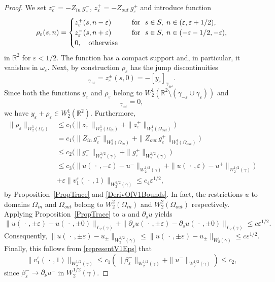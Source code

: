 \documentclass[reqno]{amsart}
\theoremstyle{plain}
\numberwithin{equation}{section}
\newcommand{\Real}{\mathbb R}
\newcommand{\eps}{\varepsilon}
\renewcommand{\leq}{\leqslant}
\begin{document}
\begin{proof}
We set $z_\eps^-=-Z_{in}\, g_\eps^-$, $z_\eps^+=-Z_{out}\, g_\eps^+$ and introduce  function
\begin{equation}\label{RhoEps}
\rho_\eps(s, n)=
\begin{cases}
   z_\eps^+(s,n-\eps)&\quad \hbox{for \ }
                  s\in S, \; n\in (\eps, \eps+1/2 ), \\
    z_\eps^-(s,n+\eps)&\quad \hbox{for \ }
               s\in S, \; n\in (-\eps-1/2,-\eps), \\
   0,\quad \hbox{otherwise}
\end{cases}
\end{equation}
in  $\Real^2$ for $\eps<1/2$.
The function has a compact support and,  in particular, it vanishes in $\omega_\eps$.
Next, by construction $\rho_\eps$ has the jump discontinuities
\begin{equation*}
  [\rho_\eps]_{\gamma_{\pm\eps}}=z_\eps^\pm(s,0)=-[y_\eps]_{\gamma_{\pm\eps}}.
\end{equation*}
Since both the functions $y_\eps$ and $\rho_\eps$ belong to $W_2^1(\Real^2\setminus(\gamma_{-\eps}\cup \gamma_\eps))$
and
\begin{equation*}
 [y_\eps+\rho_\eps]_{\gamma_{\pm\eps}}=0,
\end{equation*}
we have $y_\eps+\rho_\eps\in W_2^1(\Real^2)$. Furthermore,
\begin{align*}
\|\rho_\eps\|_{W_2^1(\Omega_\eps)}&
\leq c_1\big( \|z_\eps^-\|_{W_2^1(\Omega_{in})} +\|z_\eps^+\|_{W_2^1(\Omega_{out})}\big)
\\
&=c_1\big(\|Z_{in}\,  g_\eps^-\|_{W_2^1(\Omega_{in})} +
\|Z_{out}\, g_\eps^+\|_{W_2^1(\Omega_{out})}\big)
\\
&\leq c_2\big(\|g_\eps^-\|_{W_2^{1/2}(\gamma)}
+\|g_\eps^+\|_{W_2^{1/2}(\gamma)}\big)
\\
&\leq c_3\big(\|u(\,\cdot\,,-\eps)-u^-\|_{W_2^{1/2}(\gamma)}
+\|u(\,\cdot\,,\eps)-u^+\|_{W_2^{1/2}(\gamma)}\big)
\\
&+\eps \|v_1^\eps(\,\cdot\,,1)\|_{W_2^{1/2}(\gamma)}\leq c_4\eps^{1/2},
\end{align*}
by Proposition~\ref{PropTrace} and \eqref{DerivOfV1Bounds}. In fact, the restrictions $u$ to domains $\Omega_{in}$ and $\Omega_{out}$ belong to $W_2^2(\Omega_{in})$ and $W_2^2(\Omega_{out})$ respectively. Applying Proposition~\ref{PropTrace} to $u$ and $\partial_su$ yields
 \begin{equation*}
   \|u(\,\cdot\,,\pm\eps)-u(\,\cdot\,,\pm0)\|_{L_2(\gamma)}+
   \|\partial_s u(\,\cdot\,,\pm\eps)-\partial_s u(\,\cdot\,,\pm0)\|_{L_2(\gamma)}\leq c\eps^{1/2}.
 \end{equation*}
Consequently,
$ \|u(\,\cdot\,,\pm\eps)-u_\pm\|_{W_2^{1/2}(\gamma)}\leq \|u(\,\cdot\,,\pm\eps)-u_\pm\|_{W_2^{1}(\gamma)}\leq c\eps^{1/2}
$.
Finally, this follows from \eqref{representV1Eps} that
\begin{equation*}
 \|v_1^\eps(\,\cdot\,,1)\|_{W_2^{1/2}(\gamma)}\leq c_1(\|\beta_\eps^-\|_{W_2^{1/2}(\gamma)}+\|u^-\|_{W_2^{1/2}(\gamma)})\leq c_2,
\end{equation*}
since $\beta_\eps^-\to  \partial_\nu u^-$ in $W_2^{1/2}(\gamma)$.
\end{proof}
\end{document}
